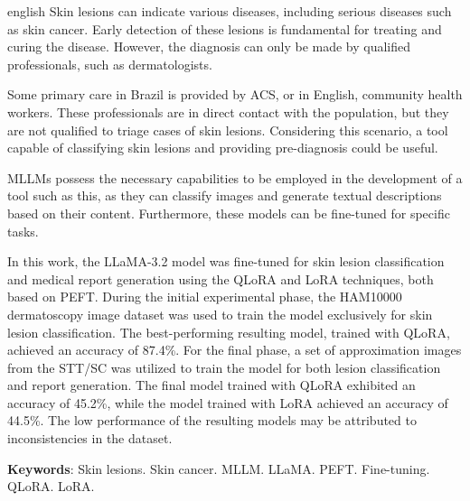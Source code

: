 \begin{resumo}[Abstract]
    \SingleSpacing
    \begin{otherlanguage*}{english}
        Skin lesions can indicate various diseases, including serious diseases such as skin cancer. Early detection of these
        lesions is fundamental for treating and curing the disease. However, the diagnosis can only be made by qualified
        professionals, such as dermatologists.

        Some primary care in Brazil is provided by \acf{ACS}, or in English, community health workers. These professionals are
        in direct contact with the population, but they are not qualified to triage cases of skin lesions. Considering this
        scenario, a tool capable of classifying skin lesions and providing pre-diagnosis could be useful.

        \acfp{MLLM} possess the necessary capabilities to be employed in the development of a tool such as this, as they can
        classify images and generate textual descriptions based on their content. Furthermore, these models can be fine-tuned
        for specific tasks.

        In this work, the \acf{LLaMA}-3.2 model was fine-tuned for skin lesion classification and medical report generation
        using the \acf{QLoRA} and \acf{LoRA} techniques, both based on \acf{PEFT}. During the initial experimental phase, the
        \acf{HAM10000} dermatoscopy image dataset was used to train the model exclusively for skin lesion classification. The
        best-performing resulting model, trained with \ac{QLoRA}, achieved an accuracy of 87.4\%. For the final phase, a set of
        approximation images from the \acf{STT/SC} was utilized to train the model for both lesion classification and report
        generation. The final model trained with \ac{QLoRA} exhibited an accuracy of 45.2\%, while the model trained with
        \ac{LoRA} achieved an accuracy of 44.5\%. The low performance of the resulting models may be attributed to
        inconsistencies in the dataset.

        \textbf{Keywords}: Skin lesions. Skin cancer. MLLM. LLaMA. PEFT. Fine-tuning. QLoRA. LoRA.
    \end{otherlanguage*}
\end{resumo}

{
\hypersetup{hidelinks}

\listoffigures

\imprimirlistadesiglas

\tableofcontents*
\cleardoublepage
}
